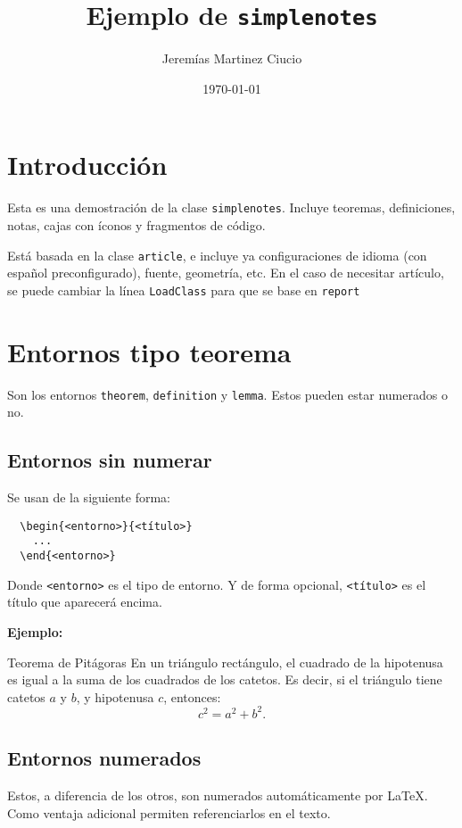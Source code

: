 \documentclass{simplenotes}
\title{Ejemplo de \texttt{simplenotes}}
\author{Jeremías Martinez Ciucio}
\date{\today}
\begin{document}
\maketitle
\newpage

\section{Introducción}

Esta es una demostración de la clase \texttt{simplenotes}. Incluye teoremas, definiciones, notas, cajas con íconos y fragmentos de código.

Está basada en la clase \texttt{article}, e incluye ya configuraciones de idioma (con español preconfigurado), fuente, geometría, etc.
En el caso de necesitar artículo, se puede cambiar la línea \texttt{LoadClass} para que se base en \texttt{report}




\section{Entornos tipo teorema} \label{sec:teoremas}

Son los entornos \texttt{theorem}, \texttt{definition} y \texttt{lemma}. Estos pueden estar numerados o no.


\subsection{Entornos sin numerar}
Se usan de la siguiente forma:
\begin{verbatim}
  \begin{<entorno>}{<título>}
    ...
  \end{<entorno>}
\end{verbatim}
Donde \texttt{<entorno>} es el tipo de entorno. Y de forma opcional, \texttt{<título>} es el título que aparecerá encima. 

\noindent
\textbf{Ejemplo:}
\begin{theorem*}{Teorema de Pitágoras}
En un triángulo rectángulo, el cuadrado de la hipotenusa es igual a la suma de los cuadrados de los catetos.  
Es decir, si el triángulo tiene catetos $a$ y $b$, y hipotenusa $c$, entonces:
\[
c^2 = a^2 + b^2.
\]
\end{theorem*}


\subsection{Entornos numerados} 
Estos, a diferencia de los otros, son numerados automáticamente por \LaTeX.
Como ventaja adicional permiten referenciarlos en el texto.
\end{document}
